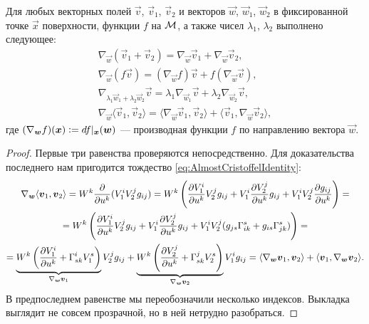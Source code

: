 \begin{proposition} \label{proposition:TranslationProperties}
	Для любых векторных полей $\vec{v}$, $\vec{v}_1$, $\vec{v}_2$ и векторов $\vec{w}$, $\vec{w}_1$, $\vec{w}_2$ в фиксированной точке $\vec{x}$ поверхности, функции $f$ на $\M$, а также чисел $\lambda_1$, $\lambda_2$ выполнено следующее:
	\begin{gather*}
		\nabla_{\vec{w}}(\vec{v}_1 + \vec{v}_2) = \nabla_{\vec{w}}\vec{v}_1 + \nabla_{\vec{w}}\vec{v}_2,\\
		\nabla_{\vec{w}}(f\vec{v}) = (\nabla_{\vec{w}}f)\vec{v} + f(\nabla_{\vec{w}}\vec{v}),\\
		\nabla_{\lambda_1\vec{w}_1 + \lambda_2\vec{w}_2}\vec{v} = \lambda_1\nabla_{\vec{w}_1}\vec{v} + \lambda_2\nabla_{\vec{w}_2}\vec{v},\\
		\nabla_{\vec{w}}\langle\vec{v}_1, \vec{v}_2\rangle = \langle\nabla_{\vec{w}}\vec{v}_1, \vec{v}_2\rangle + \langle\vec{v}_1, \nabla_{\vec{w}}\vec{v}_2\rangle,
	\end{gather*}
	где $(\nabla_{\vec{w}}f)(\vec{x}) \vcentcolon = df|_{\vec{x}}(\vec{w})$ --- производная функции $f$ по направлению вектора $\vec{w}$.
\end{proposition}

\begin{proof}
	Первые три равенства проверяются непосредственно. Для доказательства последнего нам пригодится тождество \eqref{eq:AlmostCristoffelIdentity}:
	\begin{multline*}
		\nabla_{\vec{w}}\langle\vec{v}_1, \vec{v}_2\rangle = W^k\frac{\partial}{\partial u^k}(V_1^iV_2^jg_{ij}) = W^k\br{\frac{\partial V_1^i}{\partial u^k}V_2^jg_{ij} + V_1^i\frac{\partial V_2^j}{\partial u^k}g_{ij} + V_1^iV_2^j\frac{\partial g_{ij}}{\partial u^k}} =\\ = W^k\br{\frac{\partial V_1^i}{\partial u^k}V_2^jg_{ij} + V_1^i\frac{\partial V_2^j}{\partial u^k}g_{ij} + V_1^iV_2^j(g_{js}\Gamma_{ik}^s + g_{is}\Gamma_{jk}^s)} =\\ = \underbrace{W^k\br{\frac{\partial V_1^i}{\partial u^k} + \Gamma_{sk}^iV_1^s}}_{\nabla_{\vec{w}}\vec{v}_1}V_2^jg_{ij} + \underbrace{W^k\br{\frac{\partial V_2^j}{\partial u^k} + \Gamma_{sk}^jV_2^s}}_{\nabla_{\vec{w}}\vec{v}_2}V_1^ig_{ij} = \langle\nabla_{\vec{w}}\vec{v}_1, \vec{v}_2\rangle + \langle\vec{v}_1, \nabla_{\vec{w}}\vec{v}_2\rangle.
	\end{multline*}
	В предпоследнем равенстве мы переобозначили несколько индексов. Выкладка выглядит не совсем прозрачной, но в ней нетрудно разобраться.
\end{proof}

